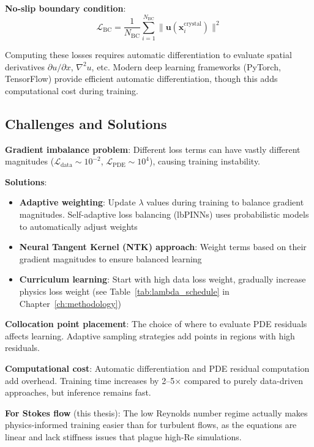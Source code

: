 \textbf{No-slip boundary condition}:
\begin{equation}
\mathcal{L}_{\text{BC}} = \frac{1}{N_{\text{BC}}} \sum_{i=1}^{N_{\text{BC}}} \|\mathbf{u}(\mathbf{x}_i^{\text{crystal}})\|^2
\end{equation}

Computing these losses requires automatic differentiation to evaluate spatial derivatives $\partial u/\partial x$, $\nabla^2 u$, etc. Modern deep learning frameworks (PyTorch, TensorFlow) provide efficient automatic differentiation, though this adds computational cost during training.

\subsection{Challenges and Solutions}

\textbf{Gradient imbalance problem}: Different loss terms can have vastly different magnitudes ($\mathcal{L}_{\text{data}} \sim 10^{-2}$, $\mathcal{L}_{\text{PDE}} \sim 10^4$), causing training instability.

\textbf{Solutions}:
\begin{itemize}
    \item \textbf{Adaptive weighting}: Update $\lambda$ values during training to balance gradient magnitudes. Self-adaptive loss balancing (lbPINNs) uses probabilistic models to automatically adjust weights
    \item \textbf{Neural Tangent Kernel (NTK) approach}: Weight terms based on their gradient magnitudes to ensure balanced learning
    \item \textbf{Curriculum learning}: Start with high data loss weight, gradually increase physics loss weight (see Table~\ref{tab:lambda_schedule} in Chapter~\ref{ch:methodology})
\end{itemize}

\textbf{Collocation point placement}: The choice of where to evaluate PDE residuals affects learning. Adaptive sampling strategies add points in regions with high residuals.

\textbf{Computational cost}: Automatic differentiation and PDE residual computation add overhead. Training time increases by 2--5$\times$ compared to purely data-driven approaches, but inference remains fast.

\textbf{For Stokes flow} (this thesis): The low Reynolds number regime actually makes physics-informed training easier than for turbulent flows, as the equations are linear and lack stiffness issues that plague high-Re simulations.

